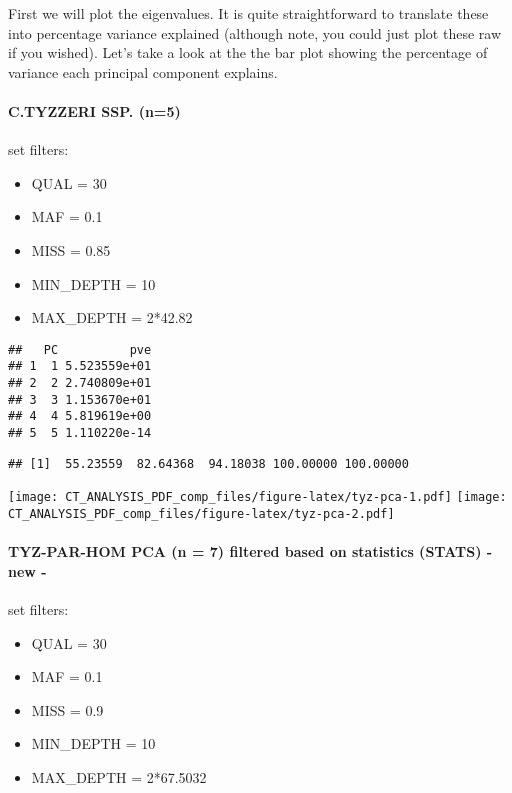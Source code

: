 \documentclass[
]{article}
\providecommand{\tightlist}{%
  \setlength{\itemsep}{0pt}\setlength{\parskip}{0pt}}
\begin{document}
First we will plot the eigenvalues. It is quite straightforward to
translate these into percentage variance explained (although note, you
could just plot these raw if you wished). Let's take a look at the the
bar plot showing the percentage of variance each principal component
explains.

\hypertarget{c.tyzzeri-ssp.-n5}{%
\paragraph{C.TYZZERI SSP. (n=5)}\label{c.tyzzeri-ssp.-n5}}

set filters:

\begin{itemize}
\tightlist
\item
  QUAL = 30
\item
  MAF = 0.1
\item
  MISS = 0.85
\item
  MIN\_DEPTH = 10
\item
  MAX\_DEPTH = 2*42.82
\end{itemize}

\begin{verbatim}
##   PC          pve
## 1  1 5.523559e+01
## 2  2 2.740809e+01
## 3  3 1.153670e+01
## 4  4 5.819619e+00
## 5  5 1.110220e-14
\end{verbatim}

\begin{verbatim}
## [1]  55.23559  82.64368  94.18038 100.00000 100.00000
\end{verbatim}

\texttt{[image: CT\_ANALYSIS\_PDF\_comp\_files/figure-latex/tyz-pca-1.pdf]}
\texttt{[image: CT\_ANALYSIS\_PDF\_comp\_files/figure-latex/tyz-pca-2.pdf]}

\hypertarget{tyz-par-hom-pca-n-7-filtered-based-on-statistics-stats---new--}{%
\paragraph{TYZ-PAR-HOM PCA (n = 7) filtered based on statistics (STATS)
- new
-}\label{tyz-par-hom-pca-n-7-filtered-based-on-statistics-stats---new--}}

set filters:

\begin{itemize}
\tightlist
\item
  QUAL = 30
\item
  MAF = 0.1
\item
  MISS = 0.9
\item
  MIN\_DEPTH = 10
\item
  MAX\_DEPTH = 2*67.5032
\end{itemize}
\end{document}

